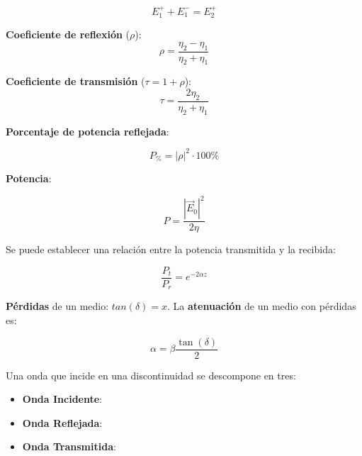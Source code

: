 \documentclass[10pt,landscape]{article}
\begin{document}
\begin{multicols}{3}
\begin{equation*}
	E_1^+ + E_1^- = E_2^+
\end{equation*}

\textbf{Coeficiente de reflexión} ($\rho$): \\

\begin{equation*}
	\rho = \frac{\eta_2 - \eta_1}{\eta_2 + \eta_1}
\end{equation*}

\textbf{Coeficiente de transmisión} ($\tau = 1 + \rho$): \\

\begin{equation*}
	\tau = \frac{2 \eta_2}{\eta_2 + \eta_1}
\end{equation*}

\textbf{Porcentaje de potencia reflejada}:

\begin{equation*}
	P_{\%} = |\rho|^2 \cdot 100\%
\end{equation*}

\textbf{Potencia}:

\begin{equation*}
    P = \frac{|\vec{E}_0|^2}{2 \eta}
\end{equation*}

Se puede establecer una relación entre la potencia transmitida y la recibida:

\begin{equation*}
	\frac{P_t}{P_r} = e^{-2\alpha z}
\end{equation*}

\textbf{Pérdidas} de un medio: $tan(\delta) = x$. La \textbf{atenuación} de un medio con pérdidas es:

\begin{equation*}
	\alpha = \beta \frac{\tan (\delta)}{2}
\end{equation*}


Una onda que incide en una discontinuidad se descompone en tres:

\begin{itemize}
    \item \textbf{Onda Incidente}: \\
    \item \textbf{Onda Reflejada}:\\
    \item \textbf{Onda Transmitida}: \\
\end{itemize}


\end{multicols}
\end{document}
